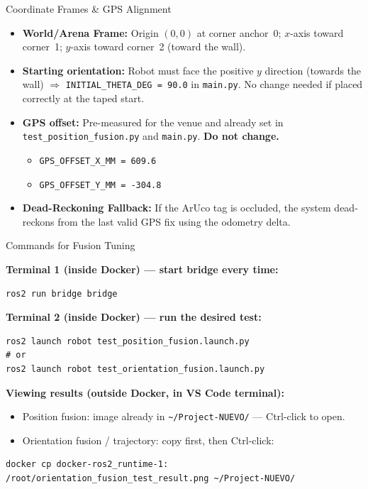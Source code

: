 \documentclass{beamer}
\begin{document}
\begin{frame}{Coordinate Frames \& GPS Alignment}
    \begin{itemize}
        \item \textbf{World/Arena Frame:} Origin $(0,0)$ at corner anchor~0; $x$-axis toward corner~1; $y$-axis toward corner~2 (toward the wall).
        \item \textbf{Starting orientation:} Robot must face the positive $y$ direction (towards the wall) $\Rightarrow$ \texttt{INITIAL\_THETA\_DEG = 90.0} in \texttt{main.py}.  No change needed if placed correctly at the taped start.
        \item \textbf{GPS offset:} Pre-measured for the venue and already set in \texttt{test\_position\_fusion.py} and \texttt{main.py}. \textbf{Do not change.}
        \begin{itemize}
            \item \texttt{GPS\_OFFSET\_X\_MM = 609.6}
            \item \texttt{GPS\_OFFSET\_Y\_MM = -304.8}
        \end{itemize}
        \item \textbf{Dead-Reckoning Fallback:} If the ArUco tag is occluded, the system dead-reckons from the last valid GPS fix using the odometry delta.
    \end{itemize}
\end{frame}

\begin{frame}[fragile]{Commands for Fusion Tuning}
    \item \textbf{Terminal 1 (inside Docker) --- start bridge every time:}
    \begin{verbatim}
ros2 run bridge bridge
    \end{verbatim}
    \item \textbf{Terminal 2 (inside Docker) --- run the desired test:}
    \begin{verbatim}
ros2 launch robot test_position_fusion.launch.py
# or
ros2 launch robot test_orientation_fusion.launch.py
    \end{verbatim}
    \item \textbf{Viewing results (outside Docker, in VS Code terminal):}
    \begin{itemize}
        \item Position fusion: image already in \texttt{\textasciitilde/Project-NUEVO/} --- Ctrl-click to open.
        \item Orientation fusion / trajectory: copy first, then Ctrl-click:
    \end{itemize}
    \begin{verbatim}
docker cp docker-ros2_runtime-1:
/root/orientation_fusion_test_result.png ~/Project-NUEVO/
    \end{verbatim}
\end{frame}
\end{document}
